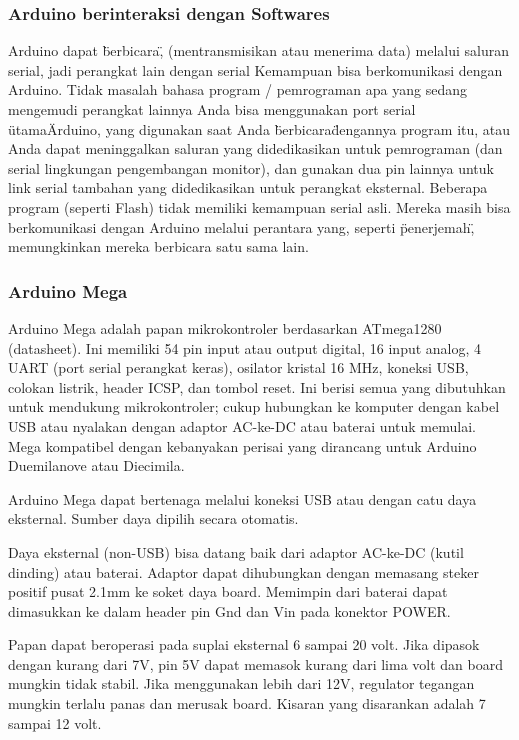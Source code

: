 \subsubsection{Arduino berinteraksi dengan Softwares}
Arduino dapat \"berbicara\", (mentransmisikan atau menerima data) melalui saluran serial, jadi perangkat lain dengan serial
Kemampuan bisa berkomunikasi dengan Arduino. Tidak masalah bahasa program / pemrograman apa yang sedang mengemudi
perangkat lainnya Anda bisa menggunakan port serial \"utama\" Arduino, yang digunakan saat Anda \"berbicara\" dengannya
program itu, atau Anda dapat meninggalkan saluran yang didedikasikan untuk pemrograman (dan serial lingkungan pengembangan
monitor), dan gunakan dua pin lainnya untuk link serial tambahan yang didedikasikan untuk perangkat eksternal. Beberapa program (seperti
Flash) tidak memiliki kemampuan serial asli. Mereka masih bisa berkomunikasi dengan Arduino melalui perantara
yang, seperti \"penerjemah\", memungkinkan mereka berbicara satu sama lain.

\subsubsection{Arduino Mega}

Arduino Mega adalah papan mikrokontroler berdasarkan ATmega1280 (datasheet). Ini memiliki 54 pin input atau output digital, 16 input analog, 4 UART (port serial perangkat keras), osilator kristal 16 MHz, koneksi USB, colokan listrik, header ICSP, dan tombol reset. Ini berisi semua yang dibutuhkan untuk mendukung mikrokontroler; cukup hubungkan ke komputer dengan kabel USB atau nyalakan dengan adaptor AC-ke-DC atau baterai untuk memulai. Mega kompatibel dengan kebanyakan perisai yang dirancang untuk Arduino Duemilanove atau Diecimila.

Arduino Mega dapat bertenaga melalui koneksi USB atau dengan catu daya eksternal. Sumber daya dipilih secara otomatis.

Daya eksternal (non-USB) bisa datang baik dari adaptor AC-ke-DC (kutil dinding) atau baterai. Adaptor dapat dihubungkan dengan memasang steker positif pusat 2.1mm ke soket daya board. Memimpin dari baterai dapat dimasukkan ke dalam header pin Gnd dan Vin pada konektor POWER.

Papan dapat beroperasi pada suplai eksternal 6 sampai 20 volt. Jika dipasok dengan kurang dari 7V, pin 5V dapat memasok kurang dari lima volt dan board mungkin tidak stabil. Jika menggunakan lebih dari 12V, regulator tegangan mungkin terlalu panas dan merusak board. Kisaran yang disarankan adalah 7 sampai 12 volt.


